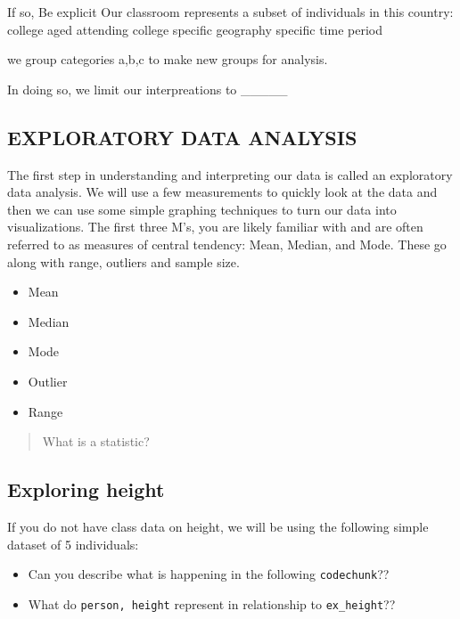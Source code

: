 \documentclass[
]{book}
\providecommand{\tightlist}{%
  \setlength{\itemsep}{0pt}\setlength{\parskip}{0pt}}
\begin{document}
If so, Be explicit
Our classroom represents a subset of individuals in this country:
college aged
attending college
specific geography
specific time period

we group categories a,b,c to make new groups for analysis.

In doing so, we limit our interpreations to \_\_\_\_\_

\hypertarget{exploratory-data-analysis}{%
\subsection{EXPLORATORY DATA ANALYSIS}\label{exploratory-data-analysis}}

The first step in understanding and interpreting our data is called an exploratory data analysis. We will use a few measurements to quickly look at the data and then we can use some simple graphing techniques to turn our data into visualizations. The first three M's, you are likely familiar with and are often referred to as measures of central tendency: Mean, Median, and Mode.
These go along with range, outliers and sample size.

\begin{itemize}
\tightlist
\item
  Mean
\item
  Median
\item
  Mode
\item
  Outlier
\item
  Range
\end{itemize}

\begin{quote}
What is a statistic?
\end{quote}

\hypertarget{exploring-height}{%
\subsection{Exploring height}\label{exploring-height}}

If you do not have class data on height, we will be using the following simple dataset of 5 individuals:

\begin{itemize}
\tightlist
\item
  Can you describe what is happening in the following \texttt{codechunk}??
\item
  What do \texttt{person,\ height} represent in relationship to \texttt{ex\_height}??
\end{itemize}
\end{document}
